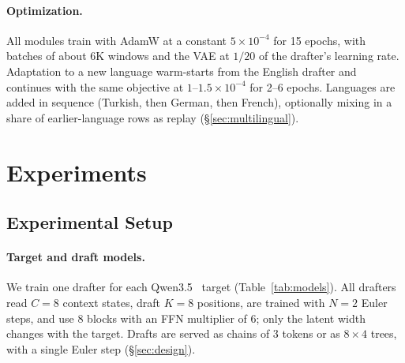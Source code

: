 \documentclass{article}
\newcommand{\TargetFamily}{Qwen3.5\xspace}          %
\newcommand{\Kdraft}{8}                        %
\newcommand{\FlowSteps}{2}                     %
\newcommand{\CtxLen}{8}                      %
\newcommand{\Kserve}{3}                      %
\newcommand{\cfLR}{$5\times10^{-4}$}
\newcommand{\cfEpochs}{15}
\newcommand{\cfTODO}{\textbf{XX}\xspace}        %
\begin{document}
\paragraph{Optimization.}
All modules train with AdamW at a constant \cfLR{} for \cfEpochs{} epochs,
with batches of about 6K windows and the VAE at $1/20$ of the drafter's
learning rate. Adaptation to a new language warm-starts from the English
drafter and continues with the same objective at $1$--$1.5\times10^{-4}$
for 2--6 epochs. Languages are added in sequence (Turkish, then German, then
French), optionally mixing in a share of earlier-language rows as replay
(\S\ref{sec:multilingual}).


\section{Experiments}
\label{sec:experiments}

\newcommand{\cfParamsS}{529M}               %
\newcommand{\cfParamsM}{1.16B}              %
\newcommand{\cfParamsL}{1.64B}              %
\newcommand{\DevTarget}{\cfTODO}            %
\newcommand{\DevK}{\cfTODO}                 %
\newcommand{\DevData}{\cfTODO}              %

\subsection{Experimental Setup}
\label{sec:expsetup}

\paragraph{Target and draft models.}
We train one drafter for each \TargetFamily{}~\citep{qwen35} target
(Table~\ref{tab:models}). All drafters read $C=\CtxLen$ context states,
draft $K=\Kdraft$ positions, are trained with $N=\FlowSteps$ Euler steps, and use 8 blocks
with an FFN multiplier of 6; only the latent width changes with the target.
Drafts are served as chains of \Kserve{} tokens or as $8\times4$ trees,
with a single Euler step (\S\ref{sec:design}).
\end{document}
